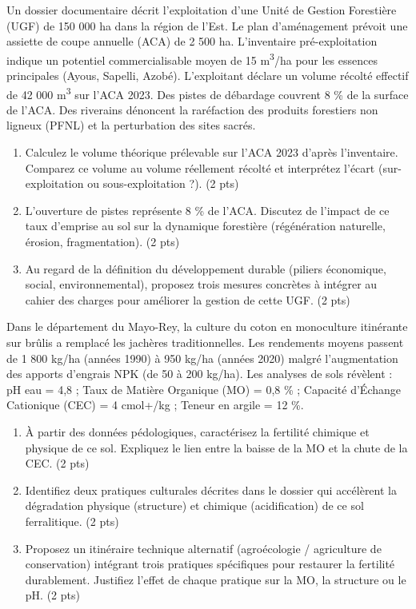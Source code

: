 \documentclass[11pt]{article}
\begin{document}
\begin{exercice}
\label{exo:foret_est}
Un dossier documentaire décrit l'exploitation d'une Unité de Gestion Forestière (UGF) de 150 000 ha dans la région de l'Est. Le plan d'aménagement prévoit une assiette de coupe annuelle (ACA) de 2 500 ha. L'inventaire pré-exploitation indique un potentiel commercialisable moyen de 15 m\textsuperscript{3}/ha pour les essences principales (Ayous, Sapelli, Azobé). L'exploitant déclare un volume récolté effectif de 42 000 m\textsuperscript{3} sur l'ACA 2023. Des pistes de débardage couvrent 8 \% de la surface de l'ACA. Des riverains dénoncent la raréfaction des produits forestiers non ligneux (PFNL) et la perturbation des sites sacrés.

\begin{enumerate}
    \item Calculez le volume théorique prélevable sur l'ACA 2023 d'après l'inventaire. Comparez ce volume au volume réellement récolté et interprétez l'écart (sur-exploitation ou sous-exploitation ?). (2 pts)
    \item L'ouverture de pistes représente 8 \% de l'ACA. Discutez de l'impact de ce taux d'emprise au sol sur la dynamique forestière (régénération naturelle, érosion, fragmentation). (2 pts)
    \item Au regard de la définition du développement durable (piliers économique, social, environnemental), proposez trois mesures concrètes à intégrer au cahier des charges pour améliorer la gestion de cette UGF. (2 pts)
\end{enumerate}
\end{exercice}

\begin{exercice}
\label{exo:sol_nord}
Dans le département du Mayo-Rey, la culture du coton en monoculture itinérante sur brûlis a remplacé les jachères traditionnelles. Les rendements moyens passent de 1 800 kg/ha (années 1990) à 950 kg/ha (années 2020) malgré l'augmentation des apports d'engrais NPK (de 50 à 200 kg/ha). Les analyses de sols révèlent : pH eau = 4,8 ; Taux de Matière Organique (MO) = 0,8 \% ; Capacité d'Échange Cationique (CEC) = 4 cmol+/kg ; Teneur en argile = 12 \%.

\begin{enumerate}
    \item À partir des données pédologiques, caractérisez la fertilité chimique et physique de ce sol. Expliquez le lien entre la baisse de la MO et la chute de la CEC. (2 pts)
    \item Identifiez deux pratiques culturales décrites dans le dossier qui accélèrent la dégradation physique (structure) et chimique (acidification) de ce sol ferralitique. (2 pts)
    \item Proposez un itinéraire technique alternatif (agroécologie / agriculture de conservation) intégrant trois pratiques spécifiques pour restaurer la fertilité durablement. Justifiez l'effet de chaque pratique sur la MO, la structure ou le pH. (2 pts)
\end{enumerate}
\end{exercice}
\end{document}
